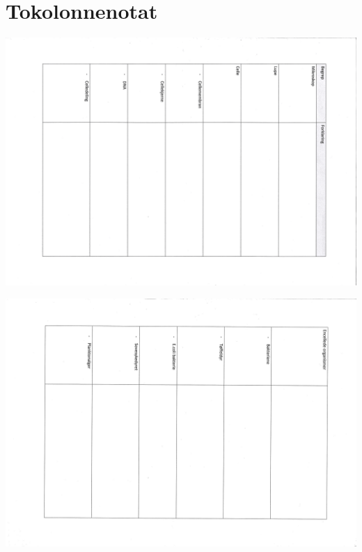 \documentclass[main.tex]{subfiles}
\begin{document}
%

%

%

\section{Tokolonnenotat}
\label{sec:tokolonnenotat}
\includegraphics[scale = 0.30,angle=90]{../figures/tokolonnenotat_side1.png}

\includegraphics[scale = 0.30,angle=90]{../figures/tokolonnenotat_side2.png}
%

%
\end{document}
